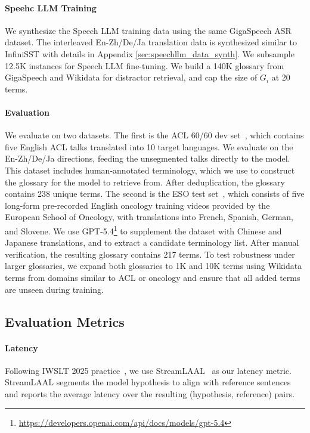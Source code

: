 \paragraph{Speehc LLM Training}
We synthesize the Speech LLM training data using the same GigaSpeech ASR dataset. The interleaved En-Zh/De/Ja translation data is synthesized similar to InfiniSST with details in Appendix \ref{sec:speechllm_data_synth}. 
We subsample 12.5K instances for Speech LLM fine-tuning. We build a 140K glossary from GigaSpeech and Wikidata for distractor retrieval, and cap the size of $G_i$ at 20 terms.

\paragraph{Evaluation} We evaluate on two datasets. The first is the ACL 60/60 dev set~\citep{salesky-etal-2023-evaluating}, which contains five English ACL talks translated into 10 target languages. We evaluate on the En-Zh/De/Ja directions, feeding the unsegmented talks directly to the model. This dataset includes human-annotated terminology, which we use to construct the glossary for the model to retrieve from. After deduplication, the glossary contains 238 unique terms. The second is the ESO test set~\citep{eso_dataset}, which consists of five long-form pre-recorded English oncology training videos provided by the European School of Oncology, with translations into French, Spanish, German, and Slovene. We use GPT-5.4\footnote{\url{https://developers.openai.com/api/docs/models/gpt-5.4}} to supplement the dataset with Chinese and Japanese translations, and to extract a candidate terminology list. After manual verification, the resulting glossary contains 217 terms. To test robustness under larger glossaries, we expand both glossaries to 1K and 10K terms using Wikidata terms from domains similar to ACL or oncology and ensure that all added terms are unseen during training.

\subsection{Evaluation Metrics}
\label{sec:evaluation}

\paragraph{Latency}
Following IWSLT 2025 practice~\citep{agostinelli-etal-2025-findings}, we use StreamLAAL~\citep{papi-etal-2024-streamatt} as our latency metric. StreamLAAL segments the model hypothesis to align with reference sentences and reports the average latency over the resulting (hypothesis, reference) pairs.

